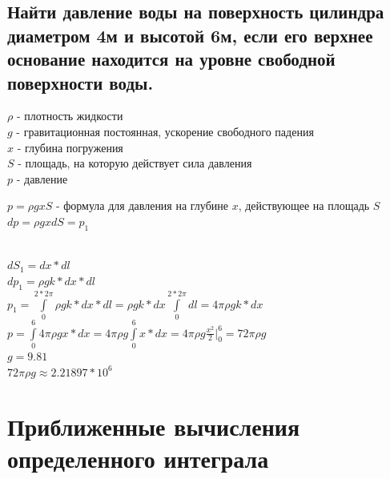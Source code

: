 \documentclass{article}
\begin{document}
\subsection{Найти давление воды на поверхность цилиндра диаметром 4м и высотой 6м, если его верхнее основание находится на уровне свободной поверхности воды.}
\begin{figure}[h!]
\end{figure}
\begin{flushleft}
$\rho$ - плотность жидкости\\
$g$ - гравитационная постоянная, ускорение свободного падения\\
$x$ - глубина погружения\\
$S$ - площадь, на которую действует сила давления\\
$p$ - давление\\
\end{flushleft}
$ p = \rho gxS $ - формула для давления на глубине $x$, действующее на площадь $S$\\
$ dp = \rho gxdS = p_1 $\\
\begin{figure}[h!]
\end{figure}\\
$ dS_1 = dx*dl $\\
$ dp_1 = \rho gk*dx*dl $\\
$ p_1 = \int\limits^{2*2\pi}_0 \rho gk*dx*dl = \rho gk*dx \int\limits^{2*2\pi}_0 dl = 4\pi \rho gk*dx $\\
$ p = \int\limits^6_0 4\pi \rho gx*dx = 4\pi \rho g \int\limits^6_0 x*dx = 4\pi \rho g\frac{x^2}{2} |^6_0 = 72\pi \rho g $\\
\small$ g = 9.81 $\\
\normalsize$ 72\pi \rho g \approx 2.21897*10^6$
\newpage
\Large
\section{Приближенные вычисления определенного интеграла}
\normalsize
\end{document}
